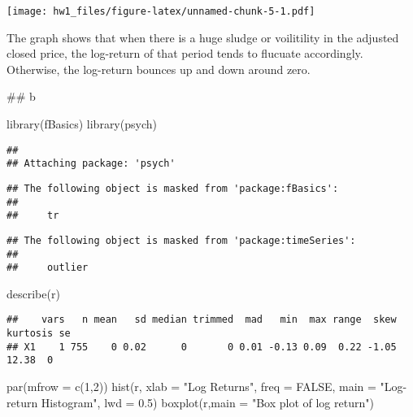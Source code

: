 \documentclass[
]{article}
\newenvironment{Shaded}{\begin{snugshade}}{\end{snugshade}}
\newcommand{\AttributeTok}[1]{\textcolor[rgb]{0.77,0.63,0.00}{#1}}
\newcommand{\ConstantTok}[1]{\textcolor[rgb]{0.00,0.00,0.00}{#1}}
\newcommand{\DecValTok}[1]{\textcolor[rgb]{0.00,0.00,0.81}{#1}}
\newcommand{\FloatTok}[1]{\textcolor[rgb]{0.00,0.00,0.81}{#1}}
\newcommand{\FunctionTok}[1]{\textcolor[rgb]{0.00,0.00,0.00}{#1}}
\newcommand{\NormalTok}[1]{#1}
\newcommand{\StringTok}[1]{\textcolor[rgb]{0.31,0.60,0.02}{#1}}
\begin{document}
\texttt{[image: hw1\_files/figure-latex/unnamed-chunk-5-1.pdf]}

The graph shows that when there is a huge sludge or voilitility in the
adjusted closed price, the log-return of that period tends to flucuate
accordingly. Otherwise, the log-return bounces up and down around zero.

\#\# b

\begin{Shaded}
\begin{Highlighting}[]
\FunctionTok{library}\NormalTok{(fBasics)}
\FunctionTok{library}\NormalTok{(psych)}
\end{Highlighting}
\end{Shaded}

\begin{verbatim}
## 
## Attaching package: 'psych'
\end{verbatim}

\begin{verbatim}
## The following object is masked from 'package:fBasics':
## 
##     tr
\end{verbatim}

\begin{verbatim}
## The following object is masked from 'package:timeSeries':
## 
##     outlier
\end{verbatim}

\begin{Shaded}
\begin{Highlighting}[]
\FunctionTok{describe}\NormalTok{(r)}
\end{Highlighting}
\end{Shaded}

\begin{verbatim}
##    vars   n mean   sd median trimmed  mad   min  max range  skew kurtosis se
## X1    1 755    0 0.02      0       0 0.01 -0.13 0.09  0.22 -1.05    12.38  0
\end{verbatim}

\begin{Shaded}
\begin{Highlighting}[]
\FunctionTok{par}\NormalTok{(}\AttributeTok{mfrow =} \FunctionTok{c}\NormalTok{(}\DecValTok{1}\NormalTok{,}\DecValTok{2}\NormalTok{))}
\FunctionTok{hist}\NormalTok{(r, }\AttributeTok{xlab =} \StringTok{"Log Returns"}\NormalTok{, }\AttributeTok{freq =} \ConstantTok{FALSE}\NormalTok{, }\AttributeTok{main =} \StringTok{"Log{-}return Histogram"}\NormalTok{, }\AttributeTok{lwd =} \FloatTok{0.5}\NormalTok{)}
\FunctionTok{boxplot}\NormalTok{(r,}\AttributeTok{main =} \StringTok{"Box plot of log return"}\NormalTok{)}
\end{Highlighting}
\end{Shaded}
\end{document}
